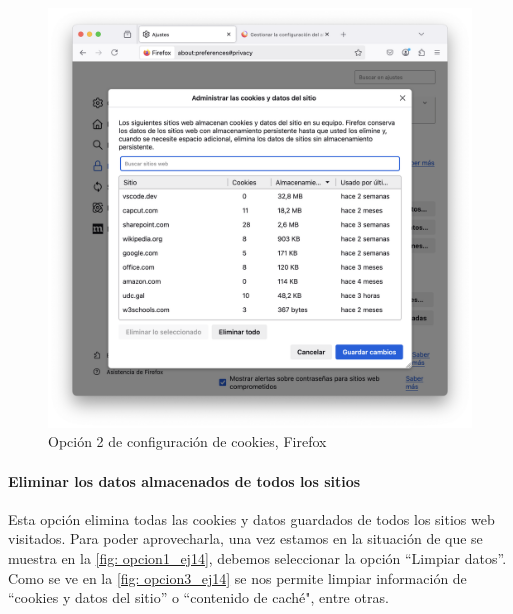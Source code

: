 \begin{figure}[H]   
    \includegraphics[width=\textwidth]{opcion2_ej14.png}
    \caption{Opción 2 de configuración de cookies, Firefox}
    \label{fig:opcion2_ej14}
\end{figure}

\paragraph{Eliminar los datos almacenados de todos los sitios}

Esta opción elimina todas las cookies y datos guardados de todos los sitios web visitados. Para poder aprovecharla, una vez estamos en la situación de que se muestra en la \ref{fig: opcion1_ej14}, debemos seleccionar la opción “Limpiar datos”. Como se ve en la \ref{fig: opcion3_ej14} se nos permite limpiar información de “cookies y datos del sitio” o “contenido de caché", entre otras. 

